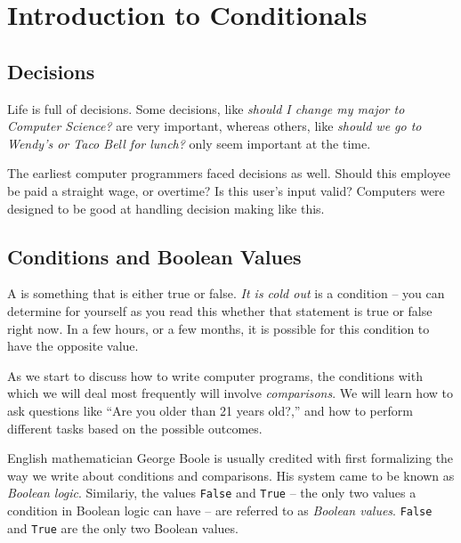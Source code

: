 
\setcounter{chapter}{5}
\chapter{Introduction to Conditionals}
\label{day:conditionals1}


\minitoc

\section{Decisions}

Life is full of decisions.  Some decisions, like \textit{should I change my major to Computer Science?}{} are very important, whereas others, like \textit{should we go to Wendy's or Taco Bell for lunch?}{} only seem important at the time.

The earliest computer programmers faced decisions as well.  Should this employee be paid a straight wage, or overtime?  Is this user's input valid?  Computers were designed to be good at handling decision making like this.

\section{Conditions and Boolean Values}

A  is something that is either true or false.  \textit{It is cold out} is a condition -- you can determine for yourself as you read this whether that statement is true or false right now.  In a few hours, or a few months, it is possible for this condition to have the opposite value.

As we start to discuss how to write computer programs, the conditions with which we will deal most frequently will involve \textit{comparisons}.  We will learn how to ask questions like ``Are you older than 21 years old?,'' and how to perform different tasks based on the possible outcomes.

English mathematician George Boole is usually credited with first formalizing the way we write about conditions and comparisons.  His system came to be known as \textit{Boolean logic}.  Similariy, the values \texttt{False} and \texttt{True} -- the only two values a condition in Boolean logic can have -- are referred to as \textit{Boolean values}.  \texttt{False} and \texttt{True} are the only two Boolean values.

